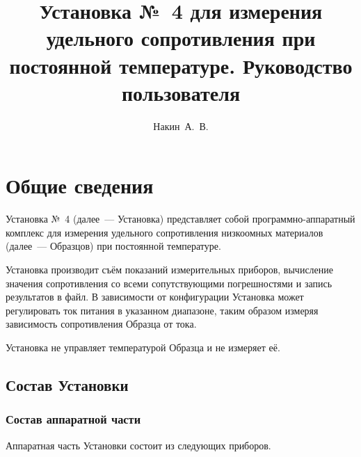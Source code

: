 \documentclass[12pt, a4paper, twocolumn]{book}
\title{Установка №~4 для измерения удельного сопротивления при постоянной температуре. Руководство пользователя}
\author{Накин~А.~В.}
\begin{document}
\maketitle

\tableofcontents

\chapter{Общие сведения}

Установка №~4 (далее~--- Установка) представляет собой программно-аппаратный комплекс для измерения удельного сопротивления низкоомных материалов (далее~--- Образцов) при постоянной температуре.

Установка производит съём показаний измерительных приборов, вычисление значения сопротивления со всеми сопутствующими погрешностями и запись результатов в файл. В зависимости от конфигурации Установка может регулировать ток питания в указанном диапазоне, таким образом измеряя зависимость сопротивления Образца от тока.

Установка не управляет температурой Образца и не измеряет её.

\section{Состав Установки}

\subsection{Состав аппаратной части}

Аппаратная часть Установки состоит из следующих приборов.
\end{document}
